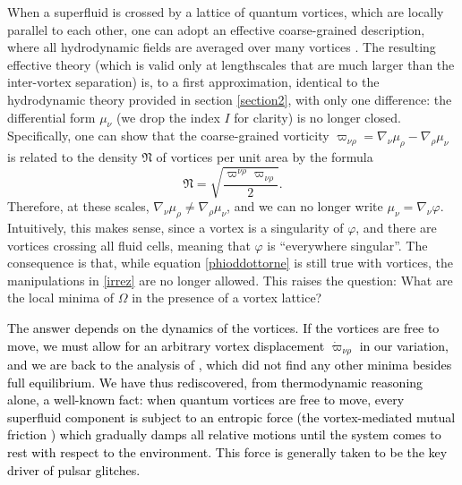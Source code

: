 \documentclass[a4paper, amsfonts, amssymb, amsmath, reprint, showkeys, nofootinbib, twoside,notitlepage,onecolumn]{revtex4-2}
\theoremstyle{definition}
\theoremstyle{theorem}
\theoremstyle{corollary}
\begin{document}
When a superfluid is crossed by a lattice of quantum vortices, which are locally parallel to each other, one can adopt an effective coarse-grained description, where all hydrodynamic fields are averaged over many vortices \cite{langlois98,Gusakov:2016eom,GavassinoIordanskii2021}. The resulting effective theory (which is valid only at lengthscales that are much larger than the inter-vortex separation) is, to a first approximation, identical to the hydrodynamic theory provided in section \ref{section2}, with only one difference: the differential form $\mu_\nu$ (we drop the index $I$ for clarity) is no longer closed. Specifically, one can show that the coarse-grained vorticity $\varpi_{\nu \rho}=\nabla_{\nu}\mu_{\rho}-\nabla_{\rho}\mu_{\nu}$ is related to the density $\mathfrak{N}$ of vortices per unit area by the formula
\begin{equation}
\mathfrak{N}=\sqrt{\dfrac{\varpi^{\nu \rho}\varpi_{\nu \rho}}{2}}.
\end{equation}
Therefore, at these scales, $\nabla_\nu \mu_\rho \neq \nabla_\rho \mu_\nu$, and we can no longer write $\mu_\nu=\nabla_\nu \varphi$. Intuitively, this makes sense, since a vortex is a singularity of $\varphi$, and there are vortices crossing all fluid cells, meaning that $\varphi$ is ``everywhere singular''. The consequence is that, while equation \eqref{phioddottorne} is still true with vortices, the manipulations in \eqref{irrez} are no longer allowed. This raises the question: What are the local minima of $\Omega$ in the presence of a vortex lattice?

\textcolor{black}{The answer depends on the dynamics of the vortices. If the vortices are free to move, we must allow for an arbitrary vortex displacement $\dot{\varpi}_{\nu \rho}$ in our variation, and we are back to the analysis of \cite{GavassinoStabilityCarter2022}, which did not find any other minima besides full equilibrium. We have thus rediscovered, from thermodynamic reasoning alone, a well-known fact: when quantum vortices are free to move, every superfluid component is subject to an entropic force (the vortex-mediated mutual friction \cite{langlois98,Geo2020,GavassinoIordanskii2021}) which gradually damps all relative motions until the system comes to rest with respect to the environment. This force is generally taken to be the key driver of pulsar glitches.} 
\end{document}
